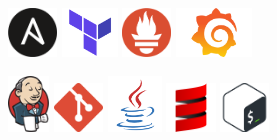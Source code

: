 \documentclass[]{friggeri-cv}
\begin{document}
\includegraphics[height=13mm]{logo/ansible-logo.png} \qquad \qquad 
\includegraphics[height=13mm]{logo/terraform-logo.png} \qquad \qquad 
\includegraphics[height=13mm]{logo/prometheus-logo.png} \qquad \qquad 
\includegraphics[height=13mm]{logo/grafana-logo.png} \qquad \qquad 
\vspace{2mm}

\qquad \qquad   \includegraphics[height=15mm]{logo/jenkins-logo.png} \qquad  \qquad
\includegraphics[height=13mm]{logo/git-logo.png} \qquad
\includegraphics[height=15mm]{logo/java-logo.png} \qquad 
\includegraphics[height=13mm]{logo/scala-logo.png} \qquad 
\includegraphics[height=13mm]{logo/bash-logo.png} \qquad
\vspace{3mm}
\end{document}
